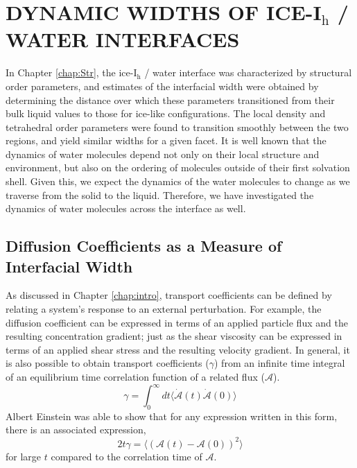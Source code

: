\chapter{DYNAMIC WIDTHS OF ICE-I$_\mathrm{h}$ / WATER INTERFACES}\label{chap:Dyn}
In Chapter \ref{chap:Str}, the ice-I$_\mathrm{h}$ / water interface
was characterized by structural order parameters, and estimates of the
interfacial width were obtained by determining the distance over which
these parameters transitioned from their bulk liquid values to those
for ice-like configurations. The local density and tetrahedral order
parameters were found to transition smoothly between the two regions,
and yield similar widths for a given facet.  It is well known that the
dynamics of water molecules depend not only on their local structure
and environment, but also on the ordering of molecules outside of
their first solvation shell. Given this, we expect the dynamics of the
water molecules to change as we traverse from the solid to the
liquid. Therefore, we have investigated the dynamics of water
molecules across the interface as well.

\section{Diffusion Coefficients as a Measure of Interfacial Width}
As discussed in Chapter \ref{chap:intro}, transport coefficients can
be defined by relating a system's response to an external
perturbation. For example, the diffusion coefficient can be expressed
in terms of an applied particle flux and the resulting concentration
gradient; just as the shear viscosity can be expressed in terms of an
applied shear stress and the resulting velocity gradient. In general,
it is also possible to obtain transport coefficients ($\gamma$) from
an infinite time integral of an equilibrium time correlation function
of a related flux ($\mathscr{A}$).
\begin{equation}\label{eq:transport1}
\gamma = \int_0^{\infty} dt \langle \dot{\mathscr{A}}(t)
\dot{\mathscr{A}}(0)\rangle 
\end{equation}
Albert Einstein was able to show that for any expression written in
this form, there is an associated expression,
\begin{equation}\label{eq:transport2}
2t\gamma = \langle (\mathscr{A}(t)-\mathscr{A}(0))^2 \rangle
\end{equation}
for large $t$ compared to the correlation time of $\mathscr{A}$. 

